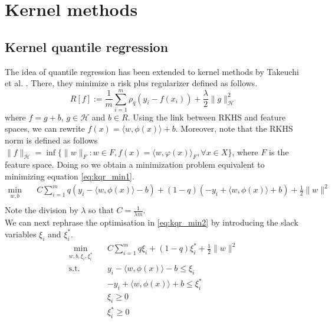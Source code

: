 \section{Kernel methods}
\subsection{Kernel quantile regression}
The idea of quantile regression has been extended to kernel methods by Takeuchi et al. \cite{takeuchi2006nonparametric}.
There, they minimize a risk plus regularizer defined as follows.
\begin{equation}\label{eq:kqr_min1}
    R[f]:=\frac{1}{m}\sum\limits_{i=1}^{m}\rho_q(y_i-f(x_i))+\frac{\lambda}{2}\|g\|_\mathcal{H}^2
\end{equation}
where $f=g+b$, $g \in \mathcal{H}$ and $b \in R$.
Using the link between RKHS and feature spaces, we can rewrite $f(x)=\langle w, \phi(x) \rangle+b$. Moreover, note that the RKHS norm is defined as follows $\|f\|_{\mathcal{H}}=\inf\{\|w\|_{F}:w\in F,f(x)=\langle w,\varphi (x)\rangle _{F},\forall x\in X\}$, where $F$ is the feature space.
 Doing so we obtain a minimization problem equivalent to minimizing equation \ref{eq:kqr_min1}.
\begin{equation}\label{eq:kqr_min2}
    \begin{aligned}
    \min_{w,b} \quad & C \sum \limits_{i=1}^{m}
    q(y_i-\langle w, \phi(x) \rangle-b)+ (1-q)(-y_i+\langle w, \phi(x) \rangle+b)+ \frac{1}{2}\|w\|^2\\
    \end{aligned}
    \end{equation}
Note the division by $\lambda$ so that $C=\frac{1}{\lambda m}$.
\\
We can next rephrase the optimisation in \ref{eq:kqr_min2} by introducing the slack variables $\xi_i$ and $\xi_i^*$.
\begin{equation}\label{eq:kqr_min3}
    \begin{aligned}
        \min_{w,b,\xi_i,\xi_i^*} \quad & C \sum \limits_{i=1}^{m}
        q \xi_i+ (1-q)\xi_i^*+ \frac{1}{2}\|w\|^2\\
    \textrm{s.t.} \quad & y_i-\langle w, \phi(x) \rangle-b \leq \xi_i\\
    & -y_i+\langle w, \phi(x) \rangle+b \leq \xi_i^*\\
      &\xi_i\geq0    \\
      &\xi_i^*\geq0    \\
    \end{aligned}
    \end{equation}
